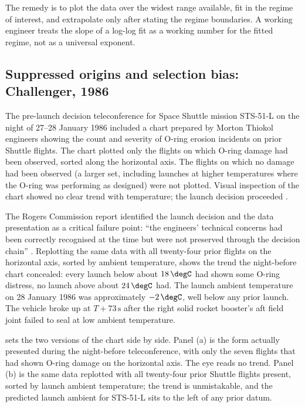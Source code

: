 The remedy is to plot the data over the widest range available, fit
in the regime of interest, and extrapolate only after stating the
regime boundaries. A working engineer treats the slope of a log-log
fit as a working number for the fitted regime, not as a universal
exponent.

\subsection{Suppressed origins and selection bias: Challenger,
1986}

The pre-launch decision teleconference for Space Shuttle mission
STS-51-L on the night of 27--28 January 1986 included a chart prepared
by Morton Thiokol engineers showing the count and severity of O-ring
erosion incidents on prior Shuttle flights. The chart plotted only
the flights on which O-ring damage had been observed, sorted along
the horizontal axis. The flights on which no damage had been
observed (a larger set, including launches at higher temperatures
where the O-ring was performing as designed) were not plotted. Visual
inspection of the chart showed no clear trend with temperature; the
launch decision proceeded \cite{acc:nasa-challenger}.

The Rogers Commission report identified the launch decision and the
data presentation as a critical failure point: ``the engineers' technical
concerns had been correctly recognised at the time but were not
preserved through the decision chain''
\cite{acc:nasa-challenger}. Replotting the same data with all
twenty-four prior flights on the horizontal axis, sorted by ambient
temperature, shows the trend the night-before chart concealed: every
launch below about $18\,\degC$ had shown some O-ring distress, no
launch above about $24\,\degC$ had. The launch ambient temperature on
28 January 1986 was approximately $-2 \,\degC$, well below any prior
launch. The vehicle broke up at $T + 73 \,\si{\second}$ after the
right solid rocket booster's aft field joint failed to seal at low
ambient temperature.



 sets the two versions of the
chart side by side. Panel (a) is the form actually presented during
the night-before teleconference, with only the seven flights that
had shown O-ring damage on the horizontal axis. The eye reads no
trend. Panel (b) is the same data replotted with all twenty-four
prior Shuttle flights present, sorted by launch ambient temperature;
the trend is unmistakable, and the predicted launch ambient for
STS-51-L sits to the left of any prior datum.

